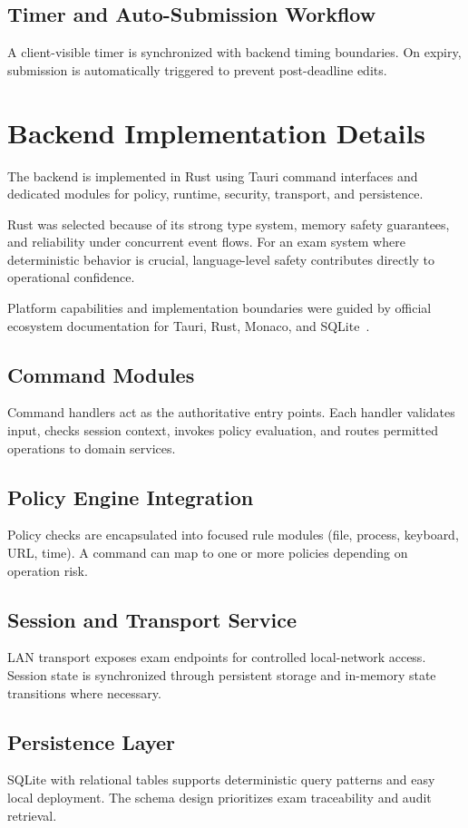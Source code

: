 \documentclass[12pt,a4paper]{report}
\begin{document}
	\subsection{Timer and Auto-Submission Workflow}
	A client-visible timer is synchronized with backend timing boundaries. On expiry, submission is automatically triggered to prevent post-deadline edits.
	
	\section{Backend Implementation Details}
	The backend is implemented in Rust using Tauri command interfaces and dedicated modules for policy, runtime, security, transport, and persistence.
	
	Rust was selected because of its strong type system, memory safety guarantees, and reliability under concurrent event flows. For an exam system where deterministic behavior is crucial, language-level safety contributes directly to operational confidence.
	
	Platform capabilities and implementation boundaries were guided by official ecosystem documentation for Tauri, Rust, Monaco, and SQLite~\cite{tauri,rust,monaco,sqlite}.
	
	\subsection{Command Modules}
	Command handlers act as the authoritative entry points. Each handler validates input, checks session context, invokes policy evaluation, and routes permitted operations to domain services.
	
	\subsection{Policy Engine Integration}
	Policy checks are encapsulated into focused rule modules (file, process, keyboard, URL, time). A command can map to one or more policies depending on operation risk.
	
	\subsection{Session and Transport Service}
	LAN transport exposes exam endpoints for controlled local-network access. Session state is synchronized through persistent storage and in-memory state transitions where necessary.
	
	\subsection{Persistence Layer}
	SQLite with relational tables supports deterministic query patterns and easy local deployment. The schema design prioritizes exam traceability and audit retrieval.
	
\end{document}
